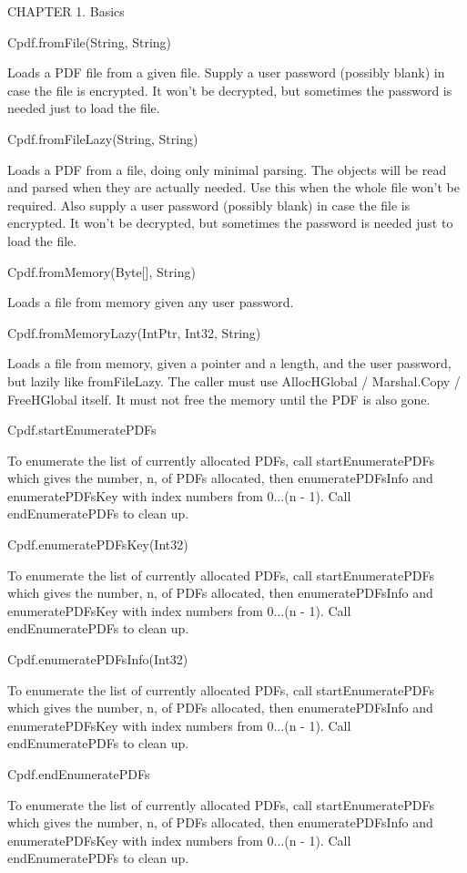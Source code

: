 CHAPTER 1. Basics

Cpdf.fromFile(String, String)

Loads a PDF file from a given file. Supply
a user password (possibly blank) in case the file is encrypted. It won't be
decrypted, but sometimes the password is needed just to load the file.

Cpdf.fromFileLazy(String, String)

Loads a PDF from a file, doing only minimal
parsing. The objects will be read and parsed when they are actually
needed. Use this when the whole file won't be required. Also supply a user
password (possibly blank) in case the file is encrypted. It won't be
decrypted, but sometimes the password is needed just to load the file.

Cpdf.fromMemory(Byte[], String)

Loads a file from memory given any user password.

Cpdf.fromMemoryLazy(IntPtr, Int32, String)

Loads a file from memory, given a
pointer and a length, and the user password, but lazily like
fromFileLazy. The caller must use AllocHGlobal / Marshal.Copy / FreeHGlobal
itself. It must not free the memory until the PDF is also gone.

Cpdf.startEnumeratePDFs

To enumerate the list of currently allocated PDFs, call
startEnumeratePDFs which gives the number, n, of PDFs allocated, then
enumeratePDFsInfo and enumeratePDFsKey with index numbers from
0...(n - 1). Call endEnumeratePDFs to clean up.

Cpdf.enumeratePDFsKey(Int32)

To enumerate the list of currently allocated PDFs, call
startEnumeratePDFs which gives the number, n, of PDFs allocated, then
enumeratePDFsInfo and enumeratePDFsKey with index numbers from
0...(n - 1). Call endEnumeratePDFs to clean up.

Cpdf.enumeratePDFsInfo(Int32)

To enumerate the list of currently allocated PDFs, call
startEnumeratePDFs which gives the number, n, of PDFs allocated, then
enumeratePDFsInfo and enumeratePDFsKey with index numbers from
0...(n - 1). Call endEnumeratePDFs to clean up.

Cpdf.endEnumeratePDFs

To enumerate the list of currently allocated PDFs, call
startEnumeratePDFs which gives the number, n, of PDFs allocated, then
enumeratePDFsInfo and enumeratePDFsKey with index numbers from
0...(n - 1). Call endEnumeratePDFs to clean up.

